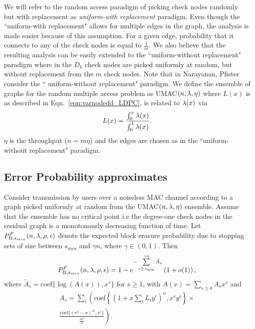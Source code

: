 We will refer to the random access paradigm of picking check nodes randomly but with replacement as \textit{uniform-with replacement} paradigm. Even though the ``uniform-with replacement" allows for multiple edges in the graph, the analysis is made easier because of this assumption. For a given edge, probability that it connects to any of the check nodes is equal to $\frac{1}{m}$. We also believe that the resulting analysis can be easily extended to the ``uniform-without replacement" paradigm where in the $D_{k}$ check nodes are picked uniformly at random, but without replacement from the $m$ check nodes. Note that in Narayanan, Pfister \cite{narayanan2012iterative} consider the `` uniform-without replacement" paradigm. We define the ensemble of graphs for the random multiple access problem as UMAC$(n,\lambda,\eta)$ where $L(x)$ is as described in Eqn.~\eqref{eqn:varnodedd_LDPC}, is related to $\lambda(x)$ via
\begin{align*}
L(x)=\frac{\int_{0}^{x}\lambda(x)}{\int_{0}^{1}\lambda(x)}.
\end{align*}
 $\eta$ is the throughput ($n=m\eta$) and the edges are chosen as in the ``uniform-without replacement" paradigm.

\subsection{Error Probability approximates}
\label{sec:UMACapproximate}
\begin{theorem}
Consider transmission by users over a noiseless MAC channel according to a graph picked uniformly at random from the UMAC$(n,\lambda,\eta)$ ensemble. Assume that the ensemble has no critical point i.e the degree-one check nodes in the residual graph is a monotonously decreasing function of time. Let $P_{\text{B},s_{min}}^{F}(n,\lambda,\rho,\epsilon)$ denote the expected block erasure probability due to stopping sets of size between $s_{min}$ and  $\gamma n$, where $\gamma\in (0,1)$. Then
\begin{align}
P_{\text{B},s_{min}}^{F}(n,\lambda,\rho,\epsilon)=1-e^{-\sum\limits_{s\geq s_{\text{min}}}^{\gamma n}\tilde{A}_{s}}\left(1+o(1)\right),
\label{Eqn:PBAnalytic}
\end{align}
where $\tilde{A}_{s}=\text{coef}\{\log(A(x)),x^s\}$ for $s\geq 1$, with $A(x)=\sum_{s\geq 0} A_{s}x^s$ and
\begin{multline}\label{Eqn:AvgSS}
A_{s}=\sum_{i}\left(\text{coef}\left\lbrace (1+x\sum_{i}L_{i}y^{i})^{n}, x^{s}y^{i} \right\rbrace \right.\times \\
\left.\frac{\text{coef}\lbrace (e^x -x)^{m},x^{i}\rbrace }{\frac{m^i}{i!}}\right). \\
\end{multline}
\label{Thm:UMACFloor}
\end{theorem}

